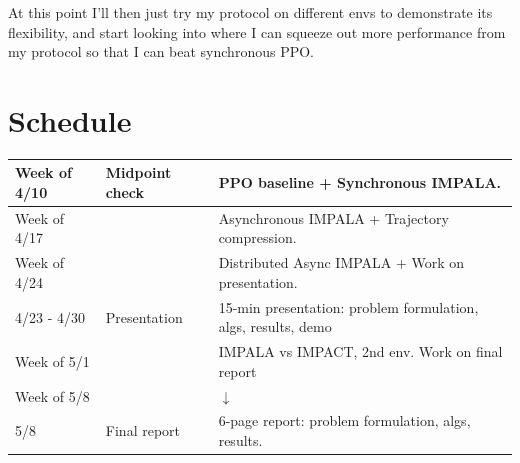 \documentclass{article}
\begin{document}
At this point I'll then just try my protocol on different envs to demonstrate its flexibility, and start
looking into where I can squeeze out more performance from my protocol so that I can beat synchronous PPO.


\section{Schedule}

\renewcommand{\arraystretch}{1.2}
\begin{tabular}{ |l|l|l| }
 \hline
 Week of 4/10 & \cellcolor{red} Midpoint check & PPO baseline + Synchronous IMPALA.\\
 \hline
 Week of 4/17 & & Asynchronous IMPALA + Trajectory compression.\\
 \hline
 Week of 4/24 & & Distributed Async IMPALA + Work on presentation.\\
 \hline

 4/23 - 4/30 & \cellcolor{red} Presentation & 15-min presentation: problem formulation, algs, results, demo \\
 \hline

 Week of 5/1 & & IMPALA vs IMPACT, 2nd env. Work on final report\\
 \hline
 Week of 5/8 & & $\downarrow$\\
 \hline

 5/8 & \cellcolor{red} Final report & 6-page report: problem formulation, algs, results. \\
 \hline
\end{tabular}

\end{document}
